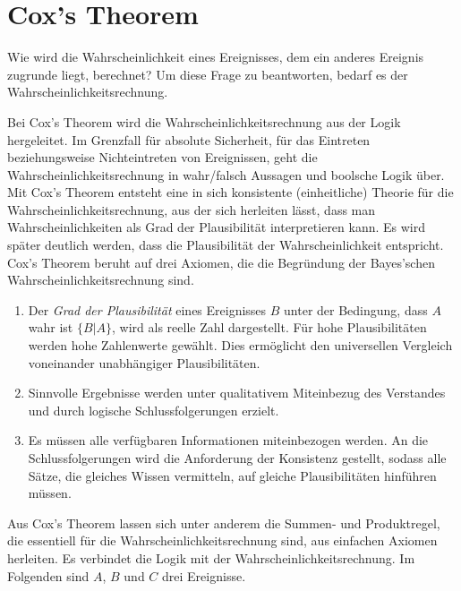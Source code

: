 \section{Cox's Theorem}
Wie wird die Wahrscheinlichkeit eines Ereignisses, dem ein anderes Ereignis zugrunde liegt, berechnet? Um diese Frage zu beantworten, bedarf es der Wahrscheinlichkeitsrechnung.

Bei Cox's Theorem wird die Wahrscheinlichkeitsrechnung aus der Logik hergeleitet. Im Grenzfall für absolute Sicherheit, für das Eintreten beziehungsweise Nichteintreten von Ereignissen, geht die Wahrscheinlichkeitsrechnung in wahr/falsch Aussagen und boolsche Logik über. Mit Cox's Theorem entsteht eine in sich konsistente (einheitliche) Theorie für die Wahrscheinlichkeitsrechnung, aus der sich herleiten lässt, dass man Wahrscheinlichkeiten als Grad der Plausibilität interpretieren kann. Es wird später deutlich werden, dass die Plausibilität der Wahrscheinlichkeit entspricht.
Cox's Theorem beruht auf drei Axiomen, die die Begründung der Bayes'schen Wahrscheinlichkeitsrechnung sind.


\begin{enumerate}
 \item Der \emph{Grad der Plausibilität} eines Ereignisses $B$ unter der Bedingung, dass $A$ wahr ist $\{B|A\}$, wird als reelle Zahl dargestellt. Für hohe Plausibilitäten werden hohe Zahlenwerte gewählt. Dies ermöglicht den universellen Vergleich voneinander unabhängiger Plausibilitäten.
 
 \item Sinnvolle Ergebnisse werden unter qualitativem Miteinbezug des Verstandes und durch logische Schlussfolgerungen erzielt.
 \item Es müssen alle verfügbaren Informationen miteinbezogen werden. An die Schlussfolgerungen wird die Anforderung der Konsistenz gestellt, sodass alle Sätze, die gleiches Wissen vermitteln, auf gleiche Plausibilitäten hinführen müssen.
\end{enumerate}


Aus Cox's Theorem lassen sich unter anderem die Summen- und Produktregel, die essentiell für die Wahrscheinlichkeitsrechnung sind, aus einfachen Axiomen herleiten.
Es verbindet die Logik mit der Wahrscheinlichkeitsrechnung. Im Folgenden sind $A$, $B$ und $C$ drei Ereignisse.

